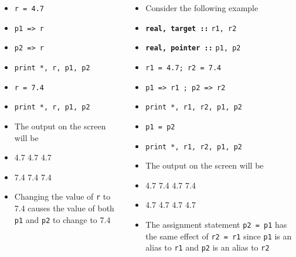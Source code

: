 \documentclass[slidestop,mathserif,compress,xcolor=svgnames]{beamer}
\newcommand{\bftt}[1]{\textbf{\texttt{#1}}}
\newenvironment{bblock}[0]
{
\begin{beamerboxesrounded}[upper=uppercol1,lower=lowercol1,shadow=true]}
{\end{beamerboxesrounded}}
\begin{document}
\begin{frame}[allowframebreaks]
\begin{columns}
\begin{bblock}{}
\begin{itemize}
        \item[] \texttt{r = 4.7}
        \item[] \texttt{p1 => r}
        \item[] \texttt{p2 => r}
        \item[] \texttt{print *, r, p1, p2}
        \item[] \texttt{r = 7.4}
        \item[] \texttt{print *, r, p1, p2}
        \item The output on the screen will be
        \item[] 4.7  4.7  4.7
        \item[] 7.4  7.4  7.4
        \item Changing the value of \texttt{r} to 7.4 causes the value of both \texttt{p1} and \texttt{p2} to change to 7.4
      \end{itemize}
    \end{bblock}
    \column{5.5cm}
    \begin{bblock}{}
      \begin{itemize}
        \item Consider the following example
        \item[] \bftt{real, target ::} \texttt{r1, r2}
        \item[] \bftt{real, pointer ::} \texttt{p1, p2}
        \item[] \texttt{r1 = 4.7; r2 = 7.4}
        \item[] \texttt{p1 => r1 ; p2 => r2}
        \item[] \texttt{print *, r1, r2, p1, p2}
        \item[] \texttt{p1 = p2}
        \item[] \texttt{print *, r1, r2, p1, p2}
        \item The output on the screen will be
        \item[] 4.7  7.4  4.7  7.4
        \item[] 4.7  4.7  4.7  4.7
        \item The assignment statement \texttt{p2 = p1} has the same effect of \texttt{r2 = r1} since \texttt{p1} is an alias to \texttt{r1} and \texttt{p2} is an alias to \texttt{r2}
      \end{itemize}
    \end{bblock}
  \end{columns}


\end{frame}
\end{document}
